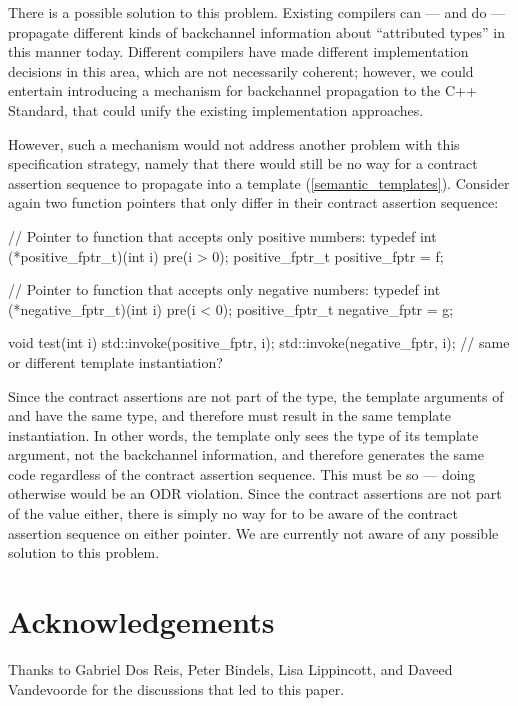 There is a possible solution to this problem. Existing compilers can --- and do --- propagate different kinds of backchannel information about ``attributed types'' in this manner today. Different compilers have made different implementation decisions in this area, which are not necessarily coherent; however, we could entertain introducing a mechanism for backchannel propagation to the C++ Standard, that could unify the existing implementation approaches.

However, such a mechanism would not address another problem with this specification strategy, namely that there would still be no way for a contract assertion sequence to propagate into a template (\ref{semantic_templates}). Consider again two function pointers that only differ in their contract assertion sequence:
\begin{codeblock}
// Pointer to function that accepts only positive numbers:
typedef int (*positive_fptr_t)(int i) pre(i > 0);
positive_fptr_t positive_fptr = f;

// Pointer to function that accepts only negative numbers:
typedef int (*negative_fptr_t)(int i) pre(i < 0);
positive_fptr_t negative_fptr = g;

void test(int i) {
  std::invoke(positive_fptr, i);
  std::invoke(negative_fptr, i);  // same or different template instantiation?
}
\end{codeblock}
Since the contract assertions are not part of the type, the template arguments of  and  have the same type, and therefore must result in the same template instantiation. In other words, the template only sees the type of its template argument, not the backchannel information, and therefore generates the same code regardless of the contract assertion sequence. This must be so --- doing otherwise would be an ODR violation. Since the contract assertions are not part of the value either, there is simply no way for  to be aware of the contract assertion sequence on either pointer. We are currently not aware of any possible solution to this problem.


\section*{Acknowledgements}

Thanks to Gabriel Dos Reis, Peter Bindels, Lisa Lippincott, and Daveed Vandevoorde for the discussions that led to this paper.


\renewcommand{\addcontentsline}[3]{}%








